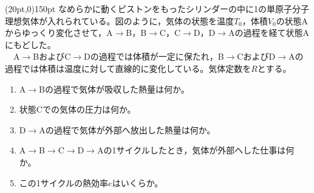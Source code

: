 \hakosyokika
\item
    \begin{mawarikomi}(20pt,0){150pt}{}
        なめらかに動くピストンをもったシリンダーの中に1の単原子分子理想気体が入れられている。図のように，気体の状態を温度$T_0$，体積$V_0$の状態Aからゆっくり変化させて，A$\rightarrow$B，B$\rightarrow$C，C$\rightarrow$D，D$\rightarrow$Aの過程を経て状態Aにもどした。\\
        ~~A$\rightarrow$BおよびC$\rightarrow$Dの過程では体積が一定に保たれ，B$\rightarrow$CおよびD$\rightarrow$Aの過程では体積は温度に対して直線的に変化している。気体定数を$R$とする。
        \begin{enumerate}
            \item A$\rightarrow$Bの過程で気体が吸収した熱量は何か。
            \item 状態Cでの気体の圧力は何か。
            \item D$\rightarrow$Aの過程で気体が外部へ放出した熱量は何か。
            \item A$\rightarrow$B$\rightarrow$C$\rightarrow$D$\rightarrow$Aの1サイクルしたとき，気体が外部へした仕事は何か。
            \item この1サイクルの熱効率$e$はいくらか。
        \end{enumerate}
    \end{mawarikomi}